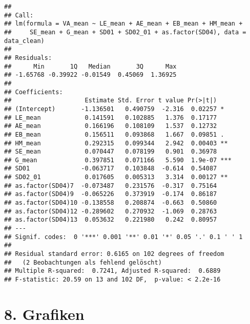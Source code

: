 \documentclass[
]{article}
\begin{document}
\begin{verbatim}
## 
## Call:
## lm(formula = VA_mean ~ LE_mean + AE_mean + EB_mean + HM_mean + 
##     SE_mean + G_mean + SD01 + SD02_01 + as.factor(SD04), data = data_clean)
## 
## Residuals:
##      Min       1Q   Median       3Q      Max 
## -1.65768 -0.39922 -0.01549  0.45069  1.36925 
## 
## Coefficients:
##                    Estimate Std. Error t value Pr(>|t|)    
## (Intercept)       -1.136501   0.490759  -2.316  0.02257 *  
## LE_mean            0.141591   0.102885   1.376  0.17177    
## AE_mean            0.166196   0.108109   1.537  0.12732    
## EB_mean            0.156511   0.093868   1.667  0.09851 .  
## HM_mean            0.292315   0.099344   2.942  0.00403 ** 
## SE_mean            0.070447   0.078199   0.901  0.36978    
## G_mean             0.397851   0.071166   5.590  1.9e-07 ***
## SD01              -0.063717   0.103848  -0.614  0.54087    
## SD02_01            0.017605   0.005313   3.314  0.00127 ** 
## as.factor(SD04)7  -0.073487   0.231576  -0.317  0.75164    
## as.factor(SD04)9  -0.065226   0.373919  -0.174  0.86187    
## as.factor(SD04)10 -0.138558   0.208874  -0.663  0.50860    
## as.factor(SD04)12 -0.289602   0.270932  -1.069  0.28763    
## as.factor(SD04)13  0.053632   0.221980   0.242  0.80957    
## ---
## Signif. codes:  0 '***' 0.001 '**' 0.01 '*' 0.05 '.' 0.1 ' ' 1
## 
## Residual standard error: 0.6165 on 102 degrees of freedom
##   (2 Beobachtungen als fehlend gelöscht)
## Multiple R-squared:  0.7241, Adjusted R-squared:  0.6889 
## F-statistic: 20.59 on 13 and 102 DF,  p-value: < 2.2e-16
\end{verbatim}

\section{8. Grafiken}\label{grafiken}
\end{document}
